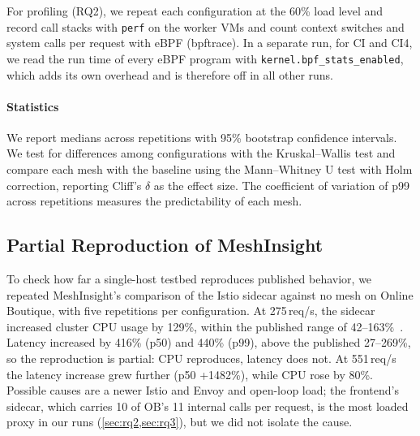 For profiling (RQ2), we repeat each configuration at the 60\% load level and
record call stacks with \texttt{perf} on the worker VMs and count context
switches and system calls per request with eBPF (bpftrace). In a separate
run, for CI and CI4, we read the run time of every eBPF program with
\texttt{kernel.bpf\_stats\_enabled}, which adds its own overhead and is
therefore off in all other runs.

\paragraph{Statistics}
We report medians across repetitions with 95\% bootstrap confidence intervals.
We test for differences among configurations with the Kruskal--Wallis test and
compare each mesh with the baseline using the Mann--Whitney U test with Holm
correction, reporting Cliff's $\delta$ as the effect size. The coefficient of
variation of p99 across repetitions measures the predictability of each mesh.

\subsection{Partial Reproduction of MeshInsight}
\label{sec:validation}

To check how far a single-host testbed reproduces published behavior, we repeated
MeshInsight's comparison of the Istio sidecar against no mesh on Online
Boutique, with five repetitions per configuration. At 275\,req/s, the sidecar
increased cluster CPU usage by 129\%, within the published range of
42--163\%~\cite{zhu2023meshinsight}. Latency increased by 416\% (p50) and 440\%
(p99), above the published 27--269\%, so the reproduction is partial: CPU
reproduces, latency does not. At 551\,req/s the latency increase grew
further (p50 +1482\%), while CPU rose by 80\%. Possible causes are a newer
Istio and Envoy and open-loop load; the frontend's sidecar, which carries 10
of OB's 11 internal calls per request, is the most loaded proxy in our runs
(\cref{sec:rq2,sec:rq3}), but we did not isolate the cause.
